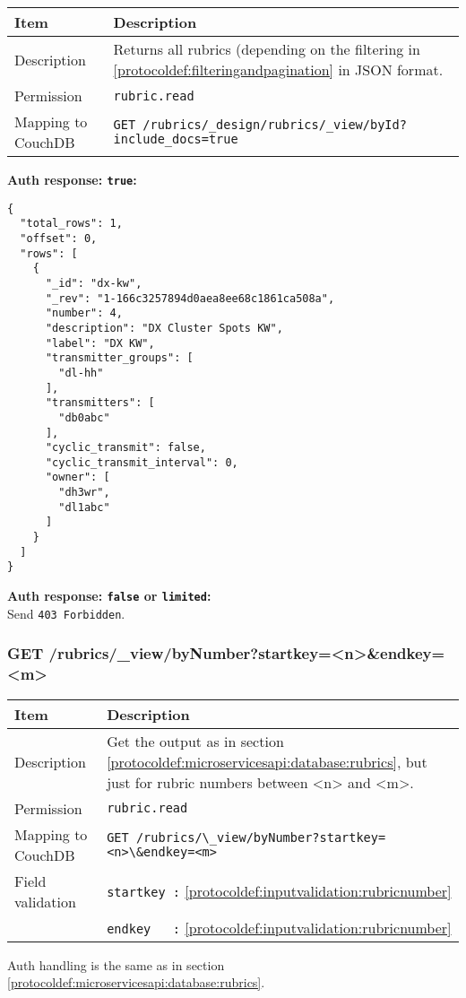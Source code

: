 \begin{table}[htbp]
  \begin{tabular}{|l|p{12cm}|} \hline
    Item               & Description  \\ \hline \hline
    Description        & Returns all rubrics (depending on the filtering in \ref{protocoldef:filteringandpagination} in JSON format. \\ \hline
    Permission         & \verb|rubric.read| \\ \hline
    Mapping to CouchDB & \verb|GET /rubrics/_design/rubrics/_view/byId?include_docs=true|\\ \hline
  \end{tabular}
\end{table}

\textbf{Auth response: \texttt{true}:}\\
\begin{lstlisting}
{
  "total_rows": 1,
  "offset": 0,
  "rows": [
    {
      "_id": "dx-kw",
      "_rev": "1-166c3257894d0aea8ee68c1861ca508a",
      "number": 4,
      "description": "DX Cluster Spots KW",
      "label": "DX KW",
      "transmitter_groups": [
        "dl-hh"
      ],
      "transmitters": [
        "db0abc"
      ],
      "cyclic_transmit": false,
      "cyclic_transmit_interval": 0,
      "owner": [
        "dh3wr",
        "dl1abc"
      ]
    }
  ]
}
\end{lstlisting}

\textbf{Auth response: \texttt{false} or \texttt{limited}:}\\
Send \verb|403 Forbidden|.

\newpage
\subsubsection{GET /rubrics/\_view/byNumber?startkey=<n>\&endkey=<m>}
\begin{table}[htbp]
  \begin{tabular}{|l|p{12cm}|} \hline
    Item               & Description  \\ \hline \hline
    Description        & Get the output as in section \ref{protocoldef:microservicesapi:database:rubrics}, but just for rubric numbers between <n> and <m>. \\ \hline
    Permission         & \verb|rubric.read| \\ \hline
    Mapping to CouchDB & \verb|GET /rubrics/\_view/byNumber?startkey=<n>\&endkey=<m>| \\ \hline
    Field validation   & \verb|startkey :| \ref{protocoldef:inputvalidation:rubricnumber} \\
                       & \verb|endkey   :| \ref{protocoldef:inputvalidation:rubricnumber} \\ \hline
  \end{tabular}
\end{table}
Auth handling is the same as in section \ref{protocoldef:microservicesapi:database:rubrics}.



